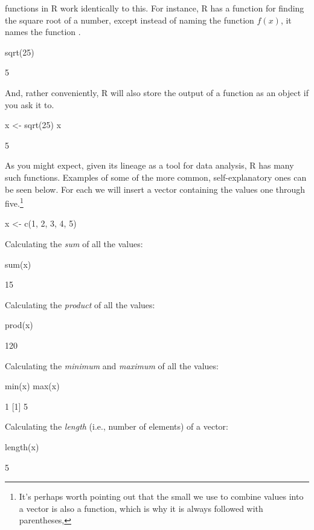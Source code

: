 \noindent
\Glspl{function} in R work identically to this.  For instance, R has a function for finding the square root of a number, except instead of naming the function $f(x)$, it names the function .  

\begin{inR}
sqrt(25)
\end{inR}
\begin{outR}
[1] 5
\end{outR}

\noindent
And, rather conveniently, R will also store the output of a function as an object if you ask it to.
\begin{inR}
x <- sqrt(25)
x
\end{inR}
\begin{outR}
[1] 5
\end{outR}


As you might expect, given its lineage as a tool for data analysis, R has many such functions.  Examples of some of the more common, self-explanatory ones can be seen below. For each we will insert a vector containing the values one through five.\footnote{It's perhaps worth pointing out that the small  we use to combine values into a vector is also a function, which is why it is always followed with parentheses, }

\begin{inR}
x <- c(1, 2, 3, 4, 5)
\end{inR}
\medskip

\noindent
Calculating the \textit{sum} of all the values:
\begin{inR}
sum(x)
\end{inR}
\begin{outR}
[1] 15
\end{outR}

\noindent
Calculating the \textit{product} of all the values:
\begin{inR}
prod(x)
\end{inR}
\begin{outR}
[1] 120
\end{outR}

\noindent
Calculating the \textit{minimum} and \textit{maximum} of all the values:
\begin{inR}
min(x)
max(x)
\end{inR}
\begin{outR}
[1]  1
[1]  5
\end{outR}

\noindent
Calculating the \textit{length} (i.e., number of elements) of a vector:
\begin{inR}
length(x)
\end{inR}
\begin{outR}
[1] 5
\end{outR}

